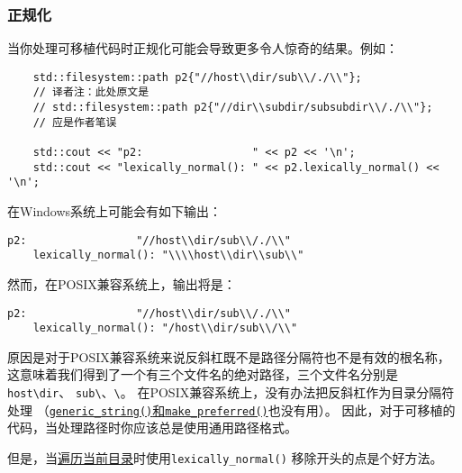 \subsubsection{正规化}
当你处理可移植代码时正规化可能会导致更多令人惊奇的结果。例如：
\begin{lstlisting}
    std::filesystem::path p2{"//host\\dir/sub\\/./\\"};
    // 译者注：此处原文是
    // std::filesystem::path p2{"//dir\\subdir/subsubdir\\/./\\"};
    // 应是作者笔误

    std::cout << "p2:                 " << p2 << '\n';
    std::cout << "lexically_normal(): " << p2.lexically_normal() << '\n';
\end{lstlisting}
在Windows系统上可能会有如下输出：
\begin{lstlisting}[stringstyle=\color{black}]
    p2:                 "//host\\dir/sub\\/./\\"
    lexically_normal(): "\\\\host\\dir\\sub\\"
\end{lstlisting}
然而，在POSIX兼容系统上，输出将是：
\begin{lstlisting}[stringstyle=\color{black}]
    p2:                 "//host\\dir/sub\\/./\\"
    lexically_normal(): "/host\\dir/sub\\/\\"
\end{lstlisting}
原因是对于POSIX兼容系统来说反斜杠既不是路径分隔符也不是有效的根名称，
这意味着我们得到了一个有三个文件名的绝对路径，三个文件名分别是\texttt{host\textbackslash dir}、
\texttt{sub\textbackslash}、\texttt{\textbackslash}。
在POSIX兼容系统上，没有办法把反斜杠作为目录分隔符处理
（\hyperref[ch20.3.4]{\texttt{generic\_string()}和\texttt{make\_preferred()}}也没有用）。
因此，对于可移植的代码，当处理路径时你应该总是使用通用路径格式。

但是，当\hyperref[遍历.]{遍历当前目录}时使用\texttt{lexically\_normal()}
移除开头的点是个好方法。


